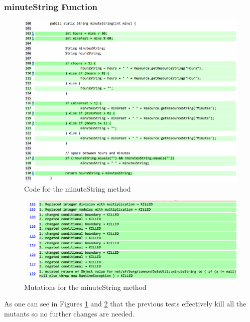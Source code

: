 \documentclass[fontsize=12pt,paper=letter,twoside]{scrartcl}
\begin{document}
\subsubsection{minuteString Function}


\begin{figure}[!htb]
\begin{center}
\includegraphics[width=.99\textwidth]{images/MutationTesting/minuteStringCode.png}
\end{center}
\caption{Code for the minuteString method}
\label{fig:minuteStringCode}
\end{figure}

\clearpage
\begin{figure}[!htb]
\begin{center}
\includegraphics[width=.99\textwidth]{images/MutationTesting/minuteStringMutant.png}
\end{center}
\caption{Mutations for the minuteString method}
\label{fig:minuteStringMutant}
\end{figure}

As one can see in Figures \ref{fig:minuteStringCode} and \ref{fig:minuteStringMutant} that the previous tests effectively kill all the mutants so no further changes are needed.
\end{document}

